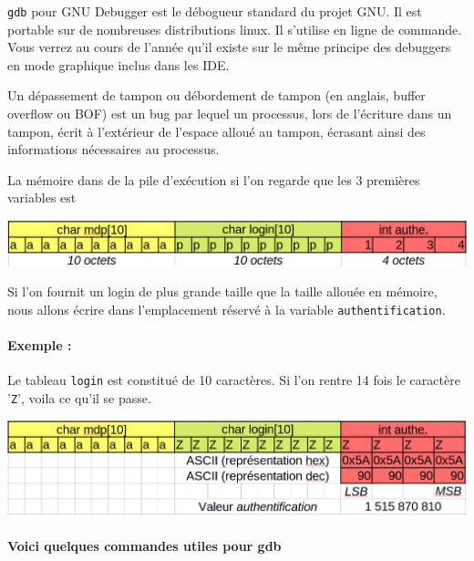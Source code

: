 \documentclass[french, 12pt]{article}%
\newcommand{\titreencadre}{Titre}
\newenvironment{encadre}[1]{\renewcommand{\titreencadre}{#1}
	\begin{mdframed}[style=encadrestyle]
	\vspace{0.5\baselineskip}
	}{%
	\end{mdframed}}
\begin{document}
\verb?gdb? pour GNU Debugger est le débogueur standard du projet GNU. Il est portable sur de nombreuses distributions linux. Il s'utilise en ligne de commande. Vous verrez au cours de l'année qu'il existe sur le même principe des debuggers en mode graphique inclus dans les IDE. 


\begin{encadre}{Buffer overflow}
Un dépassement de tampon ou débordement de tampon (en anglais, buffer overflow ou BOF) est un bug par lequel un processus, lors de l'écriture dans un tampon, écrit à l'extérieur de l'espace alloué au tampon, écrasant ainsi des informations nécessaires au processus.
\end{encadre}


La mémoire dans de la pile d'exécution  si l'on regarde que les 3 premières variables est
\begin{center}
\includegraphics[scale=0.5]{./ressource/memoire_prog}
\end{center}

Si l'on fournit un login de plus grande taille que la taille allouée en mémoire, nous allons écrire dans l'emplacement réservé à la variable \verb?authentification?. 

\paragraph{Exemple :} Le tableau \verb?login? est constitué de 10 caractères. Si l'on rentre 14 fois le caractère '\verb?Z?', voila ce qu'il se passe. 

\begin{center}
\includegraphics[scale=0.5]{./ressource/memoire_prog_over.png}
\end{center}

\vspace{0.5cm}

\paragraph{Voici quelques commandes utiles pour gdb}
\end{document}
